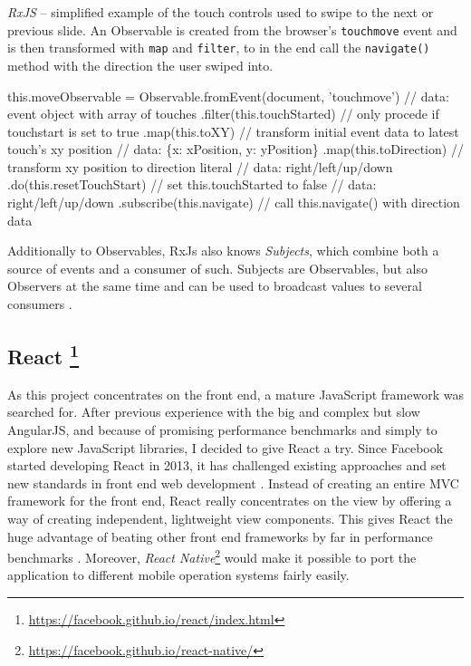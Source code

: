 \begin{program}
\caption{\emph{RxJS} -- simplified example of the touch controls used to swipe to the next or previous slide. An Observable is created from the browser's \texttt{touchmove} event and is then transformed with \texttt{map} and \texttt{filter}, to in the end call the \texttt{navigate()} method with the direction the user swiped into.}
\label{prog:implementation-technologies-rxjs}
\begin{JsCode}
this.moveObservable = Observable.fromEvent(document, 'touchmove')
  // data: event object with array of touches
  .filter(this.touchStarted) // only procede if touchstart is set to true
  .map(this.toXY) // transform initial event data to latest touch's xy position
  // data: \{x: xPosition, y: yPosition\}
  .map(this.toDirection) // transform xy position to direction literal
  // data: right/left/up/down
  .do(this.resetTouchStart) // set this.touchStarted to false
  // data: right/left/up/down
  .subscribe(this.navigate) // call this.navigate() with direction data
\end{JsCode}
\end{program}

Additionally to Observables, RxJs also knows \emph{Subjects}, which combine both a source of events and a consumer of such. Subjects are Observables, but also Observers at the same time and can be used to broadcast values to several consumers \cite{rxjs-docu}.

\subsection[React]%
             {React%
             \protect\footnote{\url{https://facebook.github.io/react/index.html}}}%
\label{sec:implementation-technologies-react}

As this project concentrates on the front end, a mature JavaScript framework was searched for. After previous experience with the big and complex but slow AngularJS, and because of promising performance benchmarks \cite{react-benchmarks} and simply to explore new JavaScript libraries, I decided to give React a try. Since Facebook started developing React in 2013, it has challenged existing approaches and set new standards in front end web development \cite{introduction-to-react}. Instead of creating an entire MVC framework for the front end, React really concentrates on the view by offering a way of creating independent, lightweight view components. This gives React the huge advantage of beating other front end frameworks by far in performance benchmarks \cite{react-benchmarks}. Moreover, \emph{React Native}\footnote{\url{https://facebook.github.io/react-native/}} would make it possible to port the application to different mobile operation systems fairly easily.

